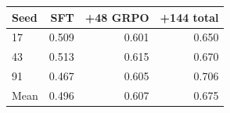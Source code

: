 \begin{tabular}{@{}lrrr@{}}
\toprule
Seed & SFT & +48 GRPO & +144 total \\
\midrule
17 & 0.509 & 0.601 & 0.650 \\
43 & 0.513 & 0.615 & 0.670 \\
91 & 0.467 & 0.605 & 0.706 \\
Mean & 0.496 & 0.607 & 0.675 \\
\bottomrule
\end{tabular}
